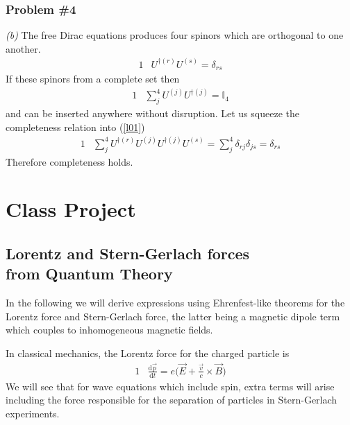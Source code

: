 \documentclass[]{article}
\numberwithin{equation}{subsection}
\begin{document}
\subsubsection*{Problem \#4}
\emph{(b)} The free Dirac equations produces four spinors which are orthogonal to one another.
\begin{alignat}{1}
  \label{l01}            &U^{\dagger(r)}U^{(s)}=\delta_{rs}
\end{alignat}
If these spinors from a complete set then
\begin{alignat}{1}
  \label{l02}            &\sum^{4}_{j}U^{(j)}U^{\dagger(j)}=\mathbb{I}_{4}
\end{alignat}
and can be inserted anywhere without disruption. Let us squeeze the completeness relation into (\ref{l01})
\begin{alignat}{1}
  \label{l03}            &\sum^{4}_{j}U^{\dagger(r)}U^{(j)}U^{\dagger(j)}U^{(s)}=\sum^{4}_{j}\delta_{rj}\delta_{js}=\delta_{rs}
\end{alignat}
Therefore completeness holds.

\section{Class Project}
\subsection{Lorentz and Stern-Gerlach forces\\ from Quantum Theory}
In the following we will derive expressions using Ehrenfest-like theorems for the Lorentz force and Stern-Gerlach force, the latter being a magnetic dipole term which couples to inhomogeneous magnetic fields.

In classical mechanics, the Lorentz force for the charged particle is 
\begin{alignat}{1}
  \label{m01}		&\frac{\mathrm{d}\vec{p}}{\mathrm{d}t}=e\big(\vec{E}+\frac{\vec{v}}{c}\times\vec{B}\big)
\end{alignat}
We will see that for wave equations which include spin, extra terms will arise including the force responsible for the separation of particles in Stern-Gerlach experiments.
\end{document}
